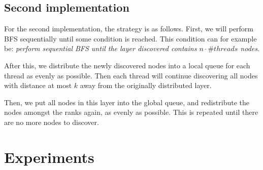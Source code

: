 \documentclass{article}
\begin{document}
\subsection{Second implementation}
For the second implementation, the strategy is as follows. First, we will perform BFS sequentially until some condition is reached. This condition can for example be: \textit{perform sequential BFS until the layer discovered contains \( n \cdot \#threads \) nodes}.
\medskip

After this, we distribute the newly discovered nodes into a local queue for each thread as evenly as possible. Then each thread will continue discovering all nodes with distance at most \( k \) away from the originally distributed layer. 
\medskip

Then, we put all nodes in this layer into the global queue, and redistribute the nodes amongst the ranks again, as evenly as possible. This is repeated until there are no more nodes to discover.

\section{Experiments}
\newpage
    \timepbfs

\end{document}
